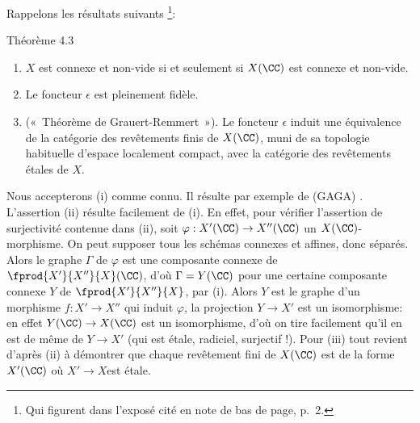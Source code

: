 \documentclass[10pt]{../fichiers-configuration-latex/smfart}
\begin{document}
Rappelons les résultats suivants \footnote{Qui figurent dans
  l'exposé cité en note de bas de page, p.~2.}: %

\begin{enonce*}{Théorème 4.3}
\begin{enumerate}
\renewcommand{\theenumi}{\roman{enumi}}
\renewcommand{\labelenumi}{(\theenumi)}
\item $X$ est connexe et non-vide si et seulement si $X(\CC)$
  est connexe et non-vide.

\item Le foncteur $\epsilon$ est pleinement fidèle.

\item (« Théorème de Grauert-Remmert »). Le foncteur $\epsilon$
  induit une équivalence de la catégorie des revêtements finis de
  $X(\CC)$, muni de sa topologie habituelle d'espace localement
  compact, avec la catégorie des revêtements étales de $X$.
\end{enumerate}
\end{enonce*}

Nous accepterons (i) comme connu. Il résulte par exemple de (GAGA) %
\cite{4}. L'assertion (ii) résulte facilement de (i). En effet, pour
vérifier l'assertion de surjectivité contenue dans (ii), soit
$\varphi:X'(\CC)\rightarrow X''(\CC)$ un
$X(\CC)$-morphisme. On peut supposer tous les schémas connexes
et affines, donc séparés. Alors le graphe $\Gamma$ de $\varphi$ est
une composante connexe de $\fprod{X'}{X''}{X}(\CC)$, d'où
$\Gamma=Y(\CC)$ pour une certaine composante connexe $Y$ de
$\fprod{X'}{X''}{X}$, par (i). Alors $Y$ est le graphe d'un morphisme
$f:X'\rightarrow X''$ qui induit $\varphi$, \ie la projection
$Y\rightarrow X'$ est un isomorphisme: en effet
$Y(\CC)\rightarrow X(\CC)$ est un isomorphisme, d'où on
tire facilement qu'il en est de même de $Y\rightarrow X'$ (qui est
étale, radiciel, surjectif !). Pour (iii) tout revient d'après (ii) à
démontrer que chaque revêtement fini de $X(\CC)$ est de la
forme $X'(\CC)$ où  $X'\rightarrow X$\pageoriginale est étale.
\end{document}
